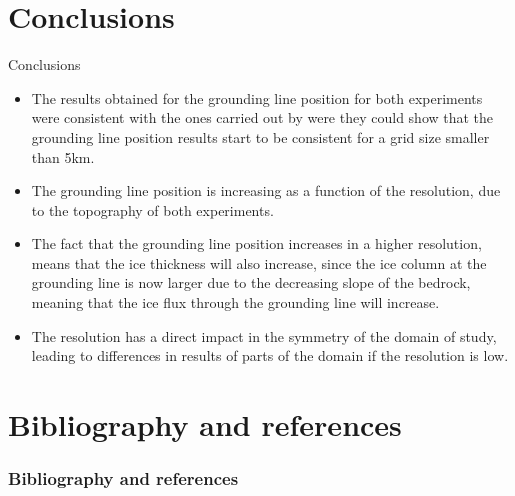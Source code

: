 \documentclass[11pt]{beamer}
\begin{document}
	\section{Conclusions}
		\begin{frame}{Conclusions}
		\begin{itemize}
			\justifying
			\item The results obtained for the grounding line position for both experiments were consistent with the ones carried out by \cite{durand2009full} were they could show that the grounding line position results start to be consistent for a grid size smaller than 5km.
			\item The grounding line position is increasing as a function of the resolution, due to the topography of both experiments.
			\item The fact that the grounding line position increases in a higher resolution, means that the ice thickness will also increase, since the ice column at the grounding line is now larger due to the decreasing slope of the bedrock, meaning that the ice flux through the grounding line will increase.
			\item The resolution has a direct impact in the symmetry of the domain of study, leading to differences in results of parts of the domain if the resolution is low.
		\end{itemize}
		\end{frame}
	\section{Bibliography and references}
		\begin{frame}[allowframebreaks]
		\frametitle{Bibliography and references}
			
			
		\end{frame}
\end{document}
